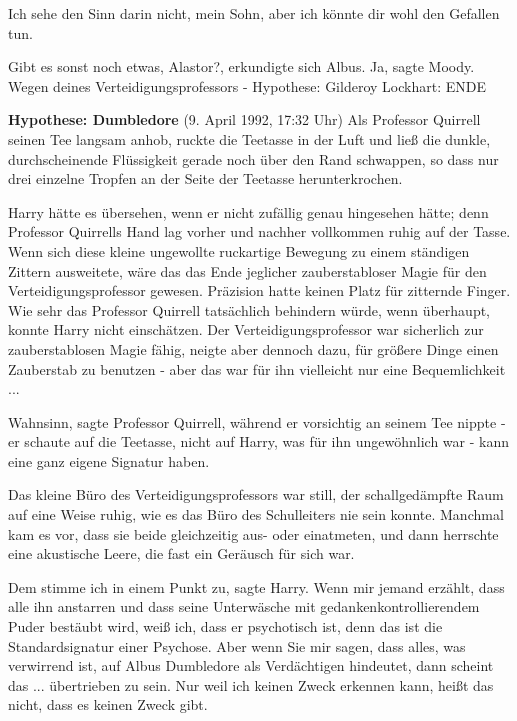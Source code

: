 \glqq{}Ich sehe den Sinn darin nicht, mein Sohn, aber ich könnte dir wohl den
Gefallen tun.\grqq{}

\glqq{}Gibt es sonst noch etwas, Alastor?\grqq{}, erkundigte sich Albus. \glqq{}
Ja\grqq{}, sagte Moody. \glqq{}Wegen deines Verteidigungsprofessors -\grqq{}
Hypothese: Gilderoy Lockhart: ENDE

\textbf{Hypothese: Dumbledore} (9. April 1992, 17:32 Uhr) Als Professor Quirrell
seinen Tee langsam anhob, ruckte die Teetasse in der Luft und ließ die dunkle,
durchscheinende Flüssigkeit gerade noch über den Rand schwappen, so dass nur
drei einzelne Tropfen an der Seite der Teetasse herunterkrochen.

Harry hätte es übersehen, wenn er nicht zufällig genau hingesehen hätte; denn
Professor Quirrells Hand lag vorher und nachher vollkommen ruhig auf der Tasse.
Wenn sich diese kleine ungewollte ruckartige Bewegung zu einem ständigen Zittern
ausweitete, wäre das das Ende jeglicher zauberstabloser Magie für den
Verteidigungsprofessor gewesen. Präzision hatte keinen Platz für zitternde
Finger. Wie sehr das Professor Quirrell tatsächlich behindern würde, wenn
überhaupt, konnte Harry nicht einschätzen. Der Verteidigungsprofessor war
sicherlich zur zauberstablosen Magie fähig, neigte aber dennoch dazu, für
größere Dinge einen Zauberstab zu benutzen - aber das war für ihn vielleicht nur
eine Bequemlichkeit ...

\glqq{}Wahnsinn\grqq{}, sagte Professor Quirrell, während er vorsichtig an seinem
Tee nippte - er schaute auf die Teetasse, nicht auf Harry, was für ihn
ungewöhnlich war - \glqq{}kann eine ganz eigene Signatur haben.\grqq{}

Das kleine Büro des Verteidigungsprofessors war still, der schallgedämpfte Raum
auf eine Weise ruhig, wie es das Büro des Schulleiters nie sein konnte. Manchmal
kam es vor, dass sie beide gleichzeitig aus- oder einatmeten, und dann herrschte
eine akustische Leere, die fast ein Geräusch für sich war.

\glqq{}Dem stimme ich in einem Punkt zu\grqq{}, sagte Harry. \glqq{}Wenn mir
jemand erzählt, dass alle ihn anstarren und dass seine Unterwäsche mit
gedankenkontrollierendem Puder bestäubt wird, weiß ich, dass er psychotisch ist,
denn das ist die Standardsignatur einer Psychose. Aber wenn Sie mir sagen, dass
alles, was verwirrend ist, auf Albus Dumbledore als Verdächtigen hindeutet, dann
scheint das ... übertrieben zu sein. Nur weil ich keinen Zweck erkennen kann,
heißt das nicht, dass es keinen Zweck gibt.\grqq{}

